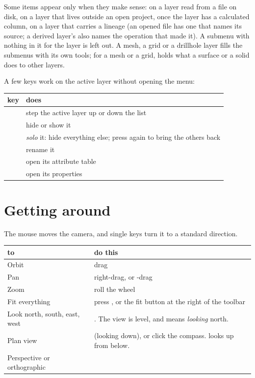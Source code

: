 Some items appear only when they make sense:  on a layer read from a file on disk,  on a layer that lives outside an open project,  once the layer has a calculated column,  on a layer that carries a lineage (an opened file has one that names its source; a derived layer's also names the operation that made it). A submenu with nothing in it for the layer is left out. A mesh, a grid or a drillhole layer fills the submenus with its own tools; for a mesh or a grid,  holds what a surface or a solid does to other layers.


A few keys work on the active layer without opening the menu:

\begin{tabularx}{\linewidth}{@{}lL@{}}\toprule
key & does \\ \midrule
\key{[} \key{]} & step the active layer up or down the list \\
 & hide or show it \\
 & \emph{solo} it: hide everything else; press again to bring the others back \\
 & rename it \\
 & open its attribute table \\
 & open its properties \\
\bottomrule
\end{tabularx}

\section{Getting around}\label{sec:start-nav}
The mouse moves the camera, and single keys turn it to a standard direction.

\begin{tabularx}{\linewidth}{@{}lL@{}}\toprule
to & do this \\ \midrule
Orbit & drag \\
Pan & right-drag, or -drag \\
Zoom & roll the wheel \\
Fit everything & press , or the fit button at the right of the toolbar \\
Look north, south, east, west &    . The view is level, and  means \emph{looking} north. \\
Plan view &  (looking down), or click the compass.  looks up from below. \\
Perspective or orthographic &  \\
\bottomrule
\end{tabularx}

